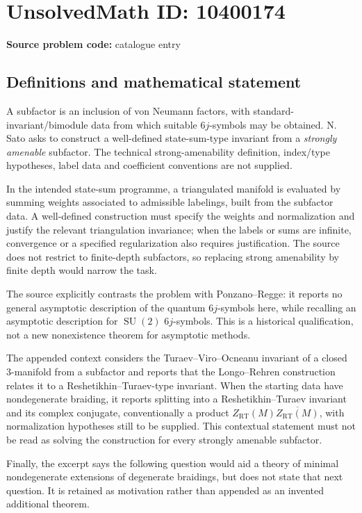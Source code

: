 \documentclass[11pt]{article}
\begin{document}
\section*{UnsolvedMath ID: 10400174}
\textbf{Source problem code:} catalogue entry
\subsection{Definitions and mathematical statement}
A subfactor is an inclusion of von Neumann factors, with standard-invariant/bimodule data from which suitable \(6j\)-symbols may be obtained. N. Sato asks to construct a well-defined state-sum-type invariant from a \emph{strongly amenable} subfactor. The technical strong-amenability definition, index/type hypotheses, label data and coefficient conventions are not supplied.

In the intended state-sum programme, a triangulated manifold is evaluated by summing weights associated to admissible labelings, built from the subfactor data. A well-defined construction must specify the weights and normalization and justify the relevant triangulation invariance; when the labels or sums are infinite, convergence or a specified regularization also requires justification. The source does not restrict to finite-depth subfactors, so replacing strong amenability by finite depth would narrow the task.

The source explicitly contrasts the problem with Ponzano--Regge: it reports no general asymptotic description of the quantum \(6j\)-symbols here, while recalling an asymptotic description for \(\operatorname{SU}(2)\) \(6j\)-symbols. This is a historical qualification, not a new nonexistence theorem for asymptotic methods.

The appended context considers the Turaev--Viro--Ocneanu invariant of a closed 3-manifold from a subfactor and reports that the Longo--Rehren construction relates it to a Reshetikhin--Turaev-type invariant. When the starting data have nondegenerate braiding, it reports splitting into a Reshetikhin--Turaev invariant and its complex conjugate, conventionally a product \(Z_{\mathrm{RT}}(M)\overline{Z_{\mathrm{RT}}(M)}\), with normalization hypotheses still to be supplied. This contextual statement must not be read as solving the construction for every strongly amenable subfactor.

Finally, the excerpt says the following question would aid a theory of minimal nondegenerate extensions of degenerate braidings, but does not state that next question. It is retained as motivation rather than appended as an invented additional theorem.
\end{document}
